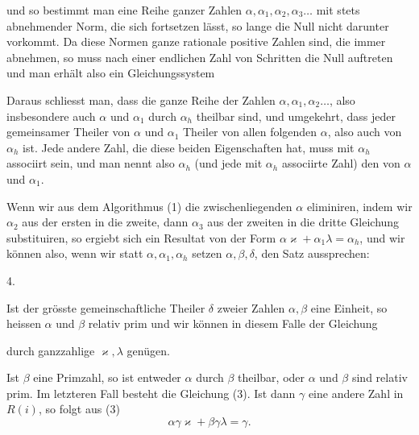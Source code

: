 und so bestimmt man eine Reihe ganzer Zahlen $\alpha, \alpha_1, \alpha_2, \alpha_3 \dots$
mit stets abnehmender Norm, die sich fortsetzen lässt, so lange
die Null nicht darunter vorkommt. Da diese Normen ganze rationale
positive Zahlen sind, die immer abnehmen, so muss nach
einer endlichen Zahl von Schritten die Null auftreten und man
erhält also ein Gleichungssystem


Daraus schliesst man, dass die ganze Reihe der Zahlen
$\alpha, \alpha_1, \alpha_2 \dots$, also insbesondere auch $\alpha$ und $\alpha_1$ durch $\alpha_h$ theilbar
sind, und umgekehrt, dass jeder gemeinsamer Theiler von $\alpha$
und $\alpha_1$ Theiler von allen folgenden $\alpha$, also auch von $\alpha_h$ ist.
Jede andere Zahl, die diese beiden Eigenschaften hat, muss
mit $\alpha_h$ associirt sein, und man nennt also $\alpha_h$ (und jede mit $\alpha_h$
associirte Zahl) den  von
$\alpha$ und $\alpha_1$.

Wenn wir aus dem Algorithmus (1) die zwischenliegenden $\alpha$
eliminiren, indem wir $\alpha_2$ aus der ersten in die zweite, dann $\alpha_3$
aus der zweiten in die dritte Gleichung substituiren, so ergiebt
sich ein Resultat von der Form $\alpha\varkappa + \alpha_1\lambda = \alpha_h$, und wir können
also, wenn wir statt $\alpha, \alpha_1, \alpha_h$ setzen $\alpha, \beta, \delta$, den Satz aussprechen:

4. 


Ist der grösste gemeinschaftliche Theiler $\delta$ zweier Zahlen
$\alpha, \beta$ eine Einheit, so heissen $\alpha$ und $\beta$ relativ prim und wir
können in diesem Falle der Gleichung

durch ganzzahlige $\varkappa, \lambda$ genügen.

Ist $\beta$ eine Primzahl, so ist entweder $\alpha$ durch $\beta$ theilbar,
oder $\alpha$ und $\beta$ sind relativ prim. Im letzteren Fall besteht die
Gleichung (3). Ist dann $\gamma$ eine andere Zahl in $R(i)$, so folgt aus (3)
\[
\alpha\gamma\varkappa + \beta\gamma\lambda = \gamma.
\]

